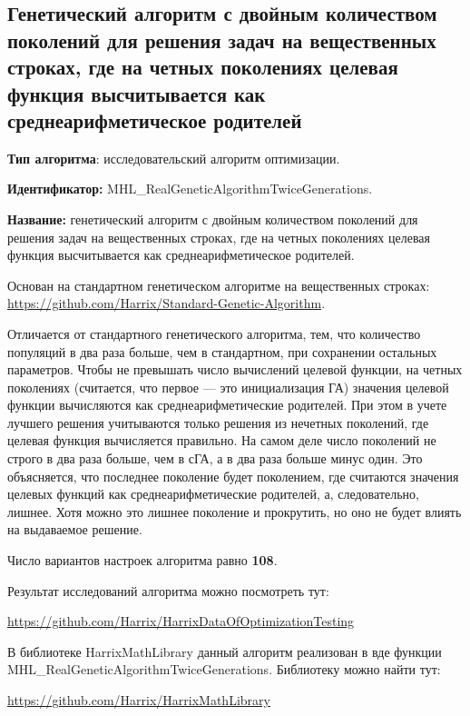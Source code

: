 \subsection{Генетический алгоритм с двойным количеством поколений для решения задач на вещественных строках, где на четных поколениях целевая функция высчитывается как среднеарифметическое родителей}\label{HarrixOptimizationAlgorithms:MHL_RealGeneticAlgorithmTwiceGenerations}

\textbf{Тип алгоритма}: исследовательский алгоритм оптимизации.

\textbf{Идентификатор:} MHL\_RealGeneticAlgorithmTwiceGenerations.

\textbf{Название:} генетический алгоритм с двойным количеством поколений для решения задач на вещественных строках, где на четных поколениях целевая функция высчитывается как среднеарифметическое родителей.

Основан на стандартном генетическом алгоритме на вещественных строках:  \href{https://github.com/Harrix/Standard-Genetic-Algorithm}{https://github.com/Harrix/Standard-Genetic-Algorithm}. 

Отличается от стандартного генетического алгоритма, тем, что количество популяций в два раза больше, чем в стандартном, при сохранении остальных параметров. Чтобы не превышать число вычислений целевой функции, на четных поколениях (считается, что первое --- это инициализация ГА) значения целевой функции вычисляются как среднеарифметические родителей. При этом в учете лучшего решения учитываются только решения из нечетных поколений, где целевая функция вычисляется правильно. На самом деле число поколений не строго в два раза больше, чем в сГА, а в два раза больше минус один. Это объясняется, что последнее поколение будет поколением, где считаются значения целевых функций как среднеарифметические родителей, а, следовательно, лишнее. Хотя можно это лишнее поколение и прокрутить, но оно не будет влиять на выдаваемое решение.

Число вариантов настроек алгоритма равно \textbf{108}.

Результат исследований алгоритма можно посмотреть тут:

\href{https://github.com/Harrix/HarrixDataOfOptimizationTesting}{https://github.com/Harrix/HarrixDataOfOptimizationTesting}

В библиотеке HarrixMathLibrary данный алгоритм реализован в вде функции MHL\_RealGeneticAlgorithmTwiceGenerations. Библиотеку можно найти тут:

\href{https://github.com/Harrix/HarrixMathLibrary}{https://github.com/Harrix/HarrixMathLibrary}